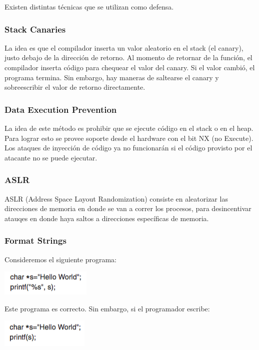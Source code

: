 Existen distintas técnicas que se utilizan como defensa.

\subsubsection{Stack Canaries}

La idea es que el compilador inserta un valor aleatorio en el stack (el canary), justo debajo de la dirección de retorno. Al momento de retornar de la función, el compilador inserta código para chequear el valor del canary. Si el valor cambió, el programa termina. Sin embargo, hay maneras de saltearse el canary y sobreescribir el valor de retorno directamente.

\subsubsection{Data Execution Prevention}

La idea de este método es prohibir que se ejecute código en el stack o en el heap. Para lograr esto se provee soporte desde el hardware con el bit NX (no Execute). Los ataques de inyección de código ya no funcionarán si el código provisto por el atacante no se puede ejecutar.

\subsubsection{ASLR}

ASLR (Address Space Layout Randomization) consiste en aleatorizar las direcciones de memoria en donde se van a correr los procesos, para desincentivar atauqes en donde haya saltos a direcciones específicas de memoria.

\subsubsection{Format Strings}

Consideremos el siguiente programa:

\includegraphics[scale=0.7]{imagenes/format-string1}

Este programa es correcto. Sin embargo, si el programador escribe:

\includegraphics[scale=0.7]{imagenes/format-string2}

